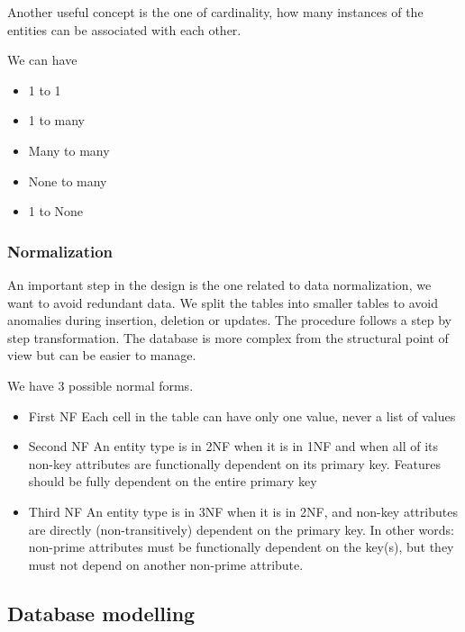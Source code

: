 \vspace{10pt}

Another useful concept is the one of cardinality, how many instances of the entities can be associated with each other. 

We can have
 \begin{itemize}
    \item 1 to 1
    \item 1 to many
    \item Many to many
    \item None to many
    \item 1 to None
\end{itemize}

\vspace{10pt}

\subsubsection{Normalization}

An important step in the design is the one related to data normalization, we want to avoid redundant data. We split 
the tables into smaller tables to avoid anomalies during insertion, deletion or updates. The 
procedure follows a step by step transformation. The database is more complex from the structural point of view but can be easier to manage.

We have 3 possible normal forms.

\begin{itemize}
    \item First NF \ra Each cell in the table can have only one value, never a list of values 
    \item Second NF \ra An entity type is in 2NF when it is in 1NF and when all of its non-key
attributes are functionally dependent on its primary key. Features should be fully dependent on the entire primary key
    \item Third NF \ra An entity type is in 3NF when it is in 2NF, and non-key attributes are
directly (non-transitively) dependent on the primary key.
In other words: non-prime attributes must be functionally dependent on the
key(s), but they must not depend on another non-prime attribute.

\end{itemize}

\vspace{10pt}


\subsection{Database modelling}

